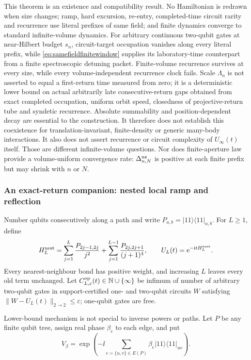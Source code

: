 This theorem is an existence and compatibility result.  No Hamiltonian is
redrawn when size changes; ramp, hard excursion, re-entry, completed-time
circuit rarity and recurrence use literal prefixes of same field; and finite
dynamics converge to standard infinite-volume dynamics.
For arbitrary continuous two-qubit gates at near-Hilbert budget $s_n$,
circuit-target occupation vanishes along every literal prefix, while
\eqref{eq:samefieldfinitewindow} supplies its laboratory-time counterpart
from a finite spectroscopic detuning packet.  Finite-volume recurrence
survives at every size, while every volume-independent recurrence clock
fails.  Scale
$\Lambda_n$ is not asserted to equal a first-return time measured from zero;
it is a deterministic lower bound on actual arbitrarily late consecutive-return
gaps obtained from exact completed occupation, uniform orbit speed, closedness
of projective-return tube and syndetic recurrence.  Absolute summability and
position-dependent decay are essential to the construction.  It therefore
does not establish this coexistence for translation-invariant, finite-density
or generic many-body interactions.  It also does not assert recurrence or
circuit complexity of $U_\infty(t)$ itself.  Those are different
infinite-volume questions.  Nor does finite-aperture law provide a
volume-uniform convergence rate: $\Delta_{n,N}^{\rm nz}$ is positive at each
finite prefix but may shrink with $n$ or $N$.

\subsubsection{An exact-return companion: nested local ramp and reflection}

Number qubits consecutively along a path and write
$P_{a,b}=|11\rangle\!\langle11|_{a,b}$.  For $L\ge1$, define
\begin{equation}
 H_L^{\rm nest}=
 \sum_{j=1}^{L}\frac{P_{2j-1,2j}}{j^2}
 +\sum_{j=1}^{L-1}\frac{P_{2j,2j+1}}{(j+1)^4},
 \qquad U_L(t)=\mathrm e^{-\mathrm i tH_L^{\rm nest}}.             \label{eq:nestedH}
\end{equation}
Every nearest-neighbour bond has positive weight, and increasing $L$ leaves
every old term unchanged.  Let $C^{\rm op}_{L,\varepsilon}(t)\in\mathbb N\cup\{\infty\}$
be infimum of number of arbitrary two-qubit gates in support-certified
one- and two-qubit circuits $W$ satisfying
$\|W-U_L(t)\|_{2\to2}\le\varepsilon$; one-qubit gates are free.

Lower-bound mechanism is not special to inverse powers or paths.  Let $P$ be
any finite qubit tree, assign real phase $\beta_e$ to each edge, and put
\[
 V_\beta=\exp\!\left(-\ii\sum_{e=\{u,v\}\in E(P)}
   \beta_e |11\rangle\!\langle11|_{uv}\right).
\]

